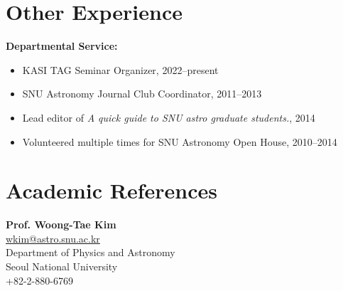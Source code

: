 \documentclass[11pt,letterpaper,roman]{moderncv}        %
\begin{document}
\section{Other Experience}
\textbf{Departmental Service:}
\begin{itemize}
\setlength\itemsep{0.0em}
\item KASI TAG Seminar Organizer, 2022--present
\item SNU Astronomy Journal Club Coordinator, 2011--2013
\item Lead editor of \textit{A quick guide to SNU astro graduate students.}, 2014
\item Volunteered multiple times for SNU Astronomy Open House, 2010--2014
\end{itemize}


\section{Academic References}

{\textbf{Prof. Woong-Tae Kim}\\
  \href{mailto:wkim@wkim.astro.snu.ac.kr}{\color{dodgerblue}wkim@astro.snu.ac.kr}\\
  Department of Physics and Astronomy\\
  Seoul National University\\
  +82-2-880-6769}
\end{document}
